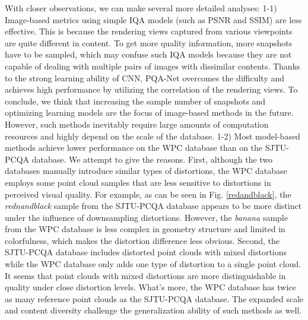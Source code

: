 \documentclass[lettersize,journal]{IEEEtran}
\begin{document}
{With closer observations, we can make several more detailed analyses: 1-1) Image-based metrics using simple IQA models (such as PSNR and SSIM) are less effective. This is because the rendering views captured from various viewpoints are quite different in content. To get more quality information, more snapshots have to be sampled, which may confuse such IQA models because they are not capable of dealing with multiple pairs of images with dissimilar contents. Thanks to the strong learning ability of CNN, PQA-Net overcomes the difficulty and achieves high performance by utilizing the correlation of the rendering views. To conclude, we think that increasing the sample number of snapshots and optimizing learning models are the focus of image-based methods in the future. However, such methods inevitably require large amounts of computation resources and highly depend on the scale of the database.  1-2) Most model-based methods achieve lower performance on the WPC database than on the SJTU-PCQA database. We attempt to give the reasons. First, although the two databases manually introduce similar types of distortions, the WPC database employs some point cloud samples that are less sensitive to distortions in perceived visual quality.
For example, as can be seen in Fig. \ref{redandblack}, the \textit{rednandblack} sample from the SJTU-PCQA database appears to be more distinct under the influence of downsampling distortions. However, the \textit{banana} sample from the WPC database is less complex in geometry structure and limited in colorfulness, which makes the distortion difference less obvious. Second, the SJTU-PCQA database includes distorted point clouds with mixed distortions while the WPC database only adds one type of distortion to a single point cloud. It seems that point clouds with mixed distortions are more distinguishable in quality under close distortion levels. What's more, the WPC database has twice as many reference point clouds as the SJTU-PCQA database. The expanded scale and content diversity challenge the generalization ability of such methods as well.}      
\end{document}
